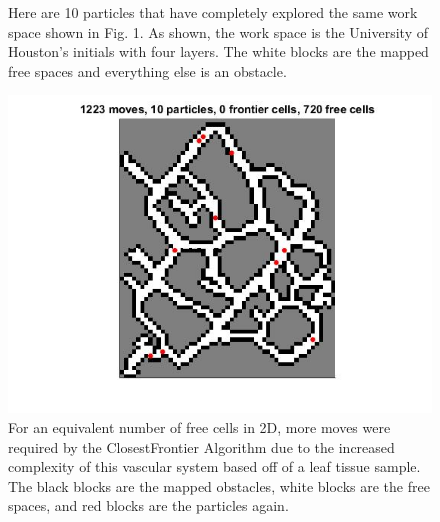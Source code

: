 \documentclass[letterpaper, 9 pt, conference]{ieeeconf}  %
\begin{document}
\begin{figure}
	\caption{Here are 10 particles that have completely explored the same work space shown in Fig. 1. As shown, the work space is the University of Houston's initials with four layers. The white blocks are the mapped free spaces and everything else is an obstacle.}
	\includegraphics[height=0.2\paperheight]{10particles_final.jpg}
	\caption{For an equivalent number of free cells in 2D, more moves were required by the ClosestFrontier Algorithm due to the increased complexity of this vascular system based off of a leaf tissue sample. The black blocks are the mapped obstacles, white blocks are the free spaces, and red blocks are the particles again.}
\end{figure}


\end{document}
